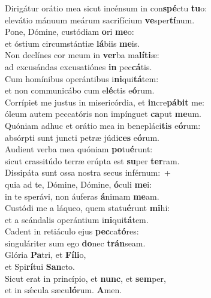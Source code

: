 \evenverse Dirigátur orátio mea sicut incénsum in con\textbf{spé}ctu \textbf{tu}o:~\*\\
\evenverse elevátio mánuum meárum sacrifícium \textbf{ve}sper\textbf{tí}num.\\
\oddverse Pone, Dómine, custódiam \textbf{o}ri \textbf{me}o:~\*\\
\oddverse et óstium circumstántiæ \textbf{lá}biis \textbf{me}is.\\
\evenverse Non declínes cor meum in \textbf{ver}ba ma\textbf{lí}\textbf{ti}æ:~\*\\
\evenverse ad excusándas excusatiónes \textbf{in} pec\textbf{cá}tis.\\
\oddverse Cum homínibus operántibus i\textbf{ni}qui\textbf{tá}tem:~\*\\
\oddverse et non communicábo cum e\textbf{lé}ctis e\textbf{ó}rum.\\
\evenverse Corrípiet me justus in misericórdia, et \textbf{in}cre\textbf{pá}\textbf{bit} me:~\*\\
\evenverse óleum autem peccatóris non impínguet \textbf{ca}put \textbf{me}um.\\
\oddverse Quóniam adhuc et orátio mea in benepláci\textbf{tis} e\textbf{ó}rum:~\*\\
\oddverse absórpti sunt juncti petræ júdi\textbf{ces} e\textbf{ó}rum.\\
\evenverse Audient verba mea quóniam \textbf{po}tu\textbf{é}runt:~\*\\
\evenverse sicut crassitúdo terræ erúpta est \textbf{su}per \textbf{ter}ram.\\
\oddverse Dissipáta sunt ossa nostra secus inférnum:~+\\
\oddverse  quia ad te, Dómine, Dómine, \textbf{ó}culi \textbf{me}i:~\*\\
\oddverse in te sperávi, non áuferas \textbf{á}nimam \textbf{me}am.\\
\evenverse Custódi me a láqueo, quem statu\textbf{é}runt \textbf{mi}hi:~\*\\
\evenverse et a scándalis operántium i\textbf{ni}qui\textbf{tá}tem.\\
\oddverse Cadent in retiáculo ejus \textbf{pec}ca\textbf{tó}res:~\*\\
\oddverse singuláriter sum ego \textbf{do}nec \textbf{trán}seam.\\
\evenverse Glória \textbf{Pa}tri, et \textbf{Fí}\textbf{li}o,~\*\\
\evenverse et Spi\textbf{rí}tui \textbf{San}cto.\\
\oddverse Sicut erat in princípio, et \textbf{nunc}, et \textbf{sem}per,~\*\\
\oddverse et in sǽcula sæcu\textbf{ló}rum. \textbf{A}men.\\
